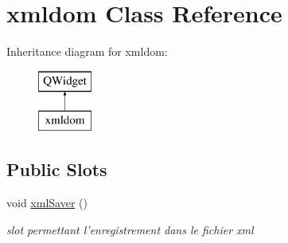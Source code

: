 \hypertarget{classxmldom}{\section{xmldom Class Reference}
\label{classxmldom}
}
Inheritance diagram for xmldom\-:\begin{figure}[H]
\begin{center}
\leavevmode
\includegraphics[height=2.000000cm]{classxmldom}
\end{center}
\end{figure}
\subsection*{Public Slots}
\begin{DoxyCompactItemize}
\item 
\hypertarget{classxmldom_a4eaf8365402c252d1056b031c06bc94f}{void \hyperlink{classxmldom_a4eaf8365402c252d1056b031c06bc94f}{xml\-Saver} ()}\label{classxmldom_a4eaf8365402c252d1056b031c06bc94f}

\begin{DoxyCompactList}\small\item\em slot permettant l'enregistrement dans le fichier xml \end{DoxyCompactList}\end{DoxyCompactItemize}
